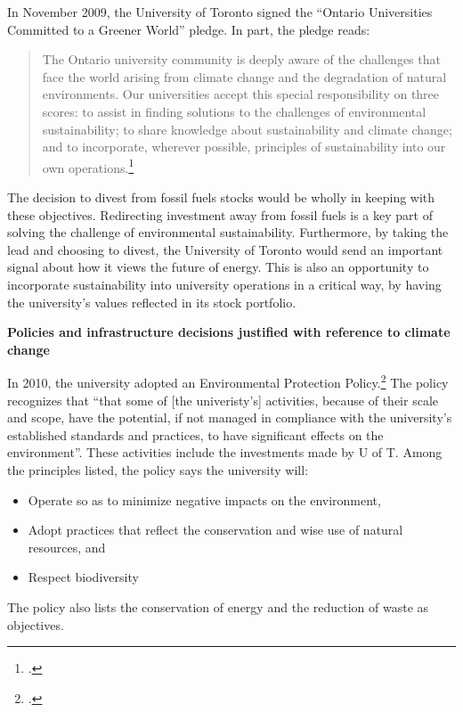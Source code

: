 In November 2009, the University of Toronto signed the ``Ontario Universities Committed to a Greener World'' pledge. In part, the pledge reads:
\begin{quote}
The Ontario university community is deeply aware of the challenges that face the world arising from climate change and the degradation of natural environments. Our universities accept this special responsibility on three scores: to assist in finding solutions to the challenges of environmental sustainability; to share knowledge about sustainability and climate change; and to incorporate, wherever possible, principles of sustainability into our own operations.\footcite[][]{OntarioPledge}
\end{quote}
The decision to divest from fossil fuels stocks would be wholly in keeping with these objectives.
Redirecting investment away from fossil fuels is a key part of solving the challenge of environmental sustainability.
Furthermore, by taking the lead and choosing to divest, the University of Toronto would send an important signal about how it views the future of energy.
This is also an opportunity to incorporate sustainability into university operations in a critical way, by having the university's values reflected in its stock portfolio.



\textbf{Policies and infrastructure decisions justified with reference to climate change}
\label{UofTActions}






In 2010, the university adopted an Environmental Protection Policy.\footcite[][]{UTEnvProtectionPolicy}
The policy recognizes that ``that some of [the univeristy's] activities, because of their scale and scope, have the potential, if not managed in compliance with the university’s established standards and practices, to have significant effects on the environment''.
These activities include the investments made by U of T.
Among the principles listed, the policy says the university will:
\begin{itemize}
	\item Operate so as to minimize negative impacts on the environment,
	\item Adopt practices that reflect the conservation and wise use of natural resources, and
	\item Respect biodiversity
\end{itemize}
The policy also lists the conservation of energy and the reduction of waste as objectives.



